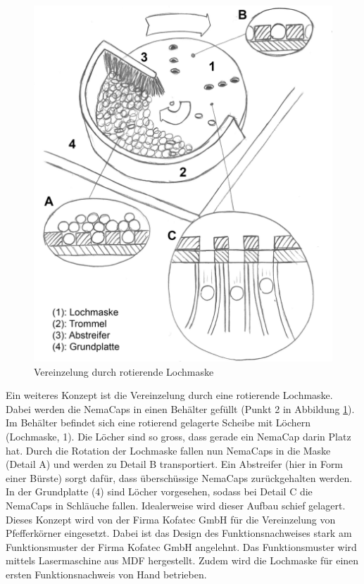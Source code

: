\begin{figure}
	\includegraphics[scale=0.52]{Illustrationen/5-Konzept/schema_vereinzelung.jpg}
	\caption{Vereinzelung durch rotierende Lochmaske}
	\label{fig:schema_vereinzelung}
\end{figure}
Ein weiteres Konzept ist die Vereinzelung durch eine rotierende Lochmaske. Dabei werden die NemaCaps in einen Behälter gefüllt (Punkt 2 in Abbildung \ref{fig:schema_vereinzelung}). Im Behälter befindet sich eine rotierend gelagerte Scheibe mit Löchern (Lochmaske, 1). Die Löcher sind so gross, dass gerade ein NemaCap darin Platz hat. Durch die Rotation der Lochmaske fallen nun NemaCaps in die Maske (Detail A) und werden zu Detail B transportiert. Ein Abstreifer (hier in Form einer Bürste) sorgt dafür, dass überschüssige NemaCaps zurückgehalten werden. In der Grundplatte (4) sind Löcher vorgesehen, sodass bei Detail C die NemaCaps in Schläuche fallen. Idealerweise wird dieser Aufbau schief gelagert. 
\newline
\newline
Dieses Konzept wird von der Firma Kofatec GmbH für die Vereinzelung von Pfefferkörner eingesetzt. Dabei ist das Design des Funktionsnachweises stark am Funktionsmuster der Firma Kofatec GmbH angelehnt. Das Funktionsmuster wird mittels Lasermaschine aus MDF hergestellt. Zudem wird die Lochmaske für einen ersten Funktionsnachweis von Hand betrieben.
